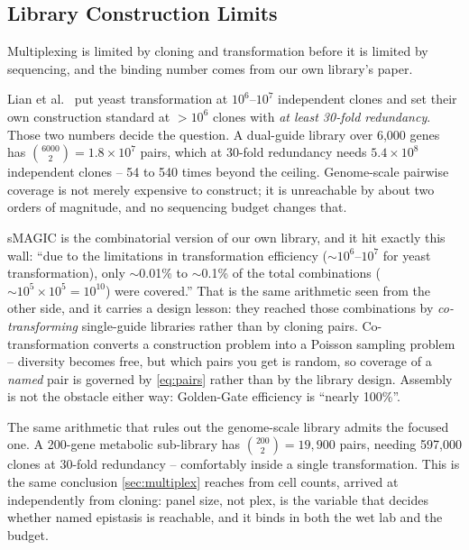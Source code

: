 \subsection{Library Construction Limits}
\label{sec:library-ceiling}

Multiplexing is limited by cloning and transformation before it is limited by
sequencing, and the binding number comes from our own library's paper.

Lian et al.\ \citep{lianMultifunctionalGenomewideCRISPR2019} put yeast
transformation at $10^{6}$--$10^{7}$ independent clones and set their own
construction standard at $>10^{6}$ clones with \emph{at least 30-fold
redundancy}. Those two numbers decide the question. A dual-guide library over
6{,}000 genes has $\binom{6000}{2}=1.8\times10^{7}$ pairs, which at 30-fold
redundancy needs $5.4\times10^{8}$ independent clones -- 54 to 540 times beyond
the ceiling. Genome-scale pairwise coverage is not merely expensive to construct;
it is unreachable by about two orders of magnitude, and no sequencing budget
changes that.

 sMAGIC is the combinatorial
version of our own library, and it hit exactly this wall: ``due to the
limitations in transformation efficiency ($\sim10^{6}$--$10^{7}$ for yeast
transformation), only $\sim$0.01\% to $\sim$0.1\% of the total combinations
($\sim10^{5}\times10^{5}=10^{10}$) were covered.'' That is the same arithmetic
seen from the other side, and it carries a design lesson: they reached those
combinations by \emph{co-transforming} single-guide libraries rather than by
cloning pairs. Co-transformation converts a construction problem into a Poisson
sampling problem -- diversity becomes free, but which pairs you get is random,
so coverage of a \emph{named} pair is governed by \cref{eq:pairs} rather than by
the library design. Assembly is not the obstacle either way: Golden-Gate
efficiency is ``nearly 100\%''.

 The same
arithmetic that rules out the genome-scale library admits the focused one.
A 200-gene metabolic sub-library has $\binom{200}{2}=19{,}900$ pairs, needing
597{,}000 clones at 30-fold redundancy -- comfortably inside a single
transformation. This is the same conclusion \cref{sec:multiplex} reaches from
cell counts, arrived at independently from cloning: panel size, not plex, is the
variable that decides whether named epistasis is reachable, and it binds in both
the wet lab and the budget.

